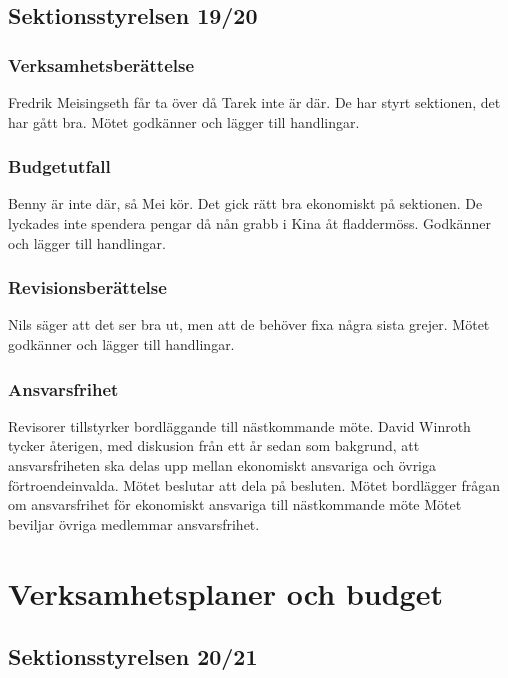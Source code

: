 \documentclass[hidelinks]{../sektionsmote} %
\begin{document}
\subsection{Sektionsstyrelsen 19/20}

\subsubsection{Verksamhetsberättelse}
Fredrik Meisingseth får ta över då Tarek inte är där.
De har styrt sektionen, det har gått bra.
Mötet godkänner och lägger till handlingar.

\subsubsection{Budgetutfall}
Benny är inte där, så Mei kör.
Det gick rätt bra ekonomiskt på sektionen.
De lyckades inte spendera pengar då nån grabb i Kina åt fladdermöss.
Godkänner och lägger till handlingar.

\subsubsection{Revisionsberättelse}
Nils säger att det ser bra ut, men att de behöver fixa några sista grejer.
Mötet godkänner och lägger till handlingar.

\subsubsection{Ansvarsfrihet}
Revisorer tillstyrker bordläggande till nästkommande möte.
David Winroth tycker återigen, med diskusion från ett år sedan som bakgrund, att ansvarsfriheten ska delas upp mellan ekonomiskt ansvariga och övriga förtroendeinvalda.
Mötet beslutar att dela på besluten.
Mötet bordlägger frågan om ansvarsfrihet för ekonomiskt ansvariga till nästkommande möte
Mötet beviljar övriga medlemmar ansvarsfrihet.


\section{Verksamhetsplaner och budget}

\subsection{Sektionsstyrelsen 20/21}
\end{document}
